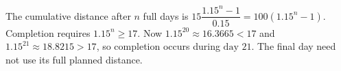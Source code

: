 The cumulative distance after $ n $ full days is $ 15\dfrac{1.15^n-1}{0.15}=100(1.15^n-1)$. Completion requires $ 1.15^n\ge17 $. Now $ 1.15^{20}\approx16.3665<17 $ and $ 1.15^{21}\approx18.8215>17 $, so completion occurs during $\boxed{\text{day }21}$. The final day need not use its full planned distance.
